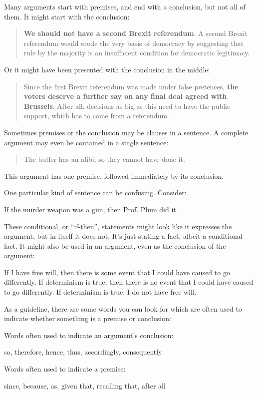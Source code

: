 Many arguments start with premises, and end with a conclusion, but not all of them. It might start with the conclusion:
	\begin{quote}\textbf{We should not have a second Brexit referendum}.
		A second Brexit referendum would erode the very basis of
		democracy by suggesting that rule by the majority is an insufficient
		condition for democratic legitimacy.
	\end{quote}
Or it might have been presented with the conclusion in the middle:
	\begin{quote}
		Since the first Brexit referendum was made under false pretences,
		\textbf{the voters deserve a further say on any final deal agreed with
		Brussels}. After all, decisions as big as this need to have the public
		support, which has to come from a referendum.
	\end{quote}


Sometimes premises or the conclusion may be clauses in a sentence.
A complete argument may even be contained in a single sentence:
\begin{quote}
The butler has an alibi; so they cannot have done it.
\end{quote}
This argument has one premise, followed immediately by its conclusion.

One particular kind of sentence can be confusing. Consider:
\begin{ebullet}
\item  If the murder weapon was a gun, then Prof. Plum did it.
\end{ebullet}
These conditional, or ``if-then'', statements might look like it expresses the argument, but in itself it does not. It's just stating a fact, albeit a conditional fact. It might also be used in an argument, even as the conclusion of the argument:
	\begin{earg}
	\prem  If I have free will, then there is some event that I could have caused to go differently.
	\prem  If determinism is true, then there is no event that I could have caused to go differently.
	\conc If determinism is true, I do not have free will.
	\end{earg}

As a guideline, there are some words you can look for which are often used to indicate whether something is a premise or conclusion:
	\begin{highlighted}
	Words often used to indicate an argument's conclusion:
		\begin{center}
			so, therefore, hence, thus, accordingly, consequently
		\end{center}
	Words often used to indicate a premise:
		\begin{center}
			since, because, as, given that, recalling that, after all
		\end{center}
	\end{highlighted}



